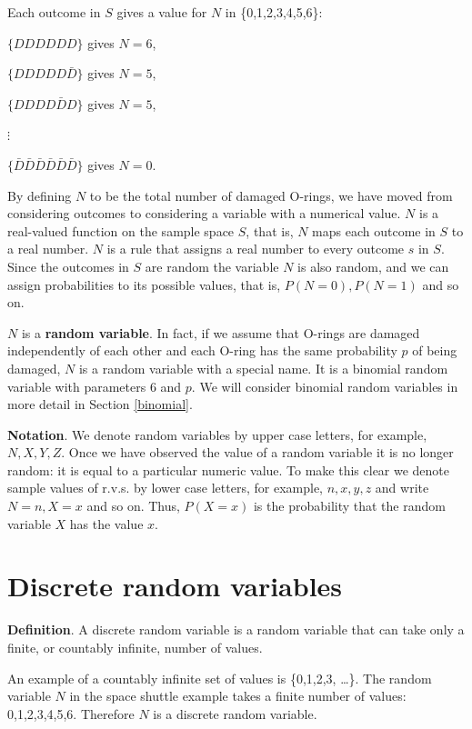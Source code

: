 \documentclass[
  british,
  11pt,
  openany, a4paper]{book}
\begin{document}
Each outcome in \(S\) gives a value for \(N\) in \{0,1,2,3,4,5,6\}:

\(\{DDDDDD\}\) gives \(N=6\),

\(\{DDDDD\bar{D}\}\) gives \(N=5\),

\(\{DDDD\bar{D}D\}\) gives \(N=5\),

\(\vdots\)

\(\{\bar{D}\bar{D}\bar{D}\bar{D}\bar{D}\bar{D}\}\) gives \(N=0\).

By defining \(N\) to be the total number of damaged O-rings, we have moved from considering outcomes to considering a variable with a numerical value. \(N\) is a real-valued function on the sample space \(S\), that is, \(N\) maps each outcome in \(S\) to a real number. \(N\) is a rule that assigns a real number to every outcome \(s\) in \(S\). Since the outcomes in \(S\) are random the variable \(N\) is also random, and we can assign probabilities to its possible values, that is, \(P(N=0), P(N=1)\) and so on.

\(N\) is a \textbf{random variable}. In fact, if we assume that O-rings are damaged independently of each other and each O-ring has the same probability \(p\) of being damaged, \(N\) is a random variable with a special name. It is a binomial random variable with parameters 6 and \(p\). We will consider binomial random variables in more detail in Section \ref{binomial}.

\textbf{Notation}. We denote random variables by upper case letters, for example, \(N, X, Y, Z\). Once we have observed the value of a random variable it is no longer random: it is equal to a particular numeric value. To make this clear we denote sample values of r.v.s. by lower case letters, for example, \(n, x, y, z\) and write \(N=n, X=x\) and so on. Thus, \(P(X=x)\) is the probability that the random variable \(X\) has the value \(x\).

\section{Discrete random variables}\label{discrete}

\textbf{Definition}. A discrete random variable is a random variable that can take only a finite, or countably infinite, number of values.

An example of a countably infinite set of values is \{0,1,2,3, \ldots\}. The random variable \(N\) in the space shuttle example takes a finite number of values: 0,1,2,3,4,5,6. Therefore \(N\) is a discrete random variable.
\end{document}
